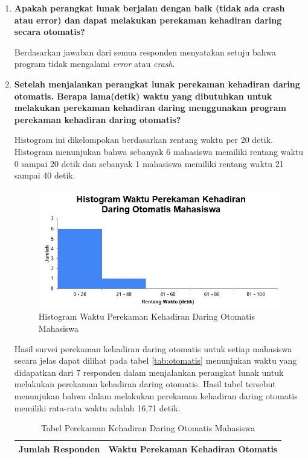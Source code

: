 \begin{enumerate}
	\item \textbf{Apakah perangkat lunak berjalan dengan baik (tidak ada crash atau error) dan dapat melakukan perekaman kehadiran daring secara otomatis?}
	
	Berdasarkan jawaban dari semua responden menyatakan setuju bahwa program tidak mengalami \textit{error} atau \textit{crash}.
	\item \textbf{Setelah menjalankan perangkat lunak perekaman kehadiran daring otomatis. Berapa lama(detik) waktu yang dibutuhkan untuk melakukan perekaman kehadiran daring menggunakan program perekaman kehadiran daring otomatis?}
	
	Histogram ini dikelompokan berdasarkan rentang waktu per 20 detik. Histogram menunjukan bahwa sebanyak 6 mahasiswa memiliki rentang waktu 0 sampai 20 detik dan sebanyak 1 mahasiswa memiliki rentang waktu 21 sampai 40 detik. 
	\begin{figure}[H]
		\centering
		\includegraphics[scale=0.75]{Gambar/HistogramDaringOtomatisMahasiswa.jpg}
		\caption{Histogram Waktu Perekaman Kehadiran Daring Otomatis Mahasiswa}
		\label{fig:olMahasiswa}
	\end{figure}
	Hasil survei perekaman kehadiran daring otomatis untuk setiap mahasiswa secara jelas dapat dilihat pada tabel \ref{tab:otomatis} menunjukan waktu yang didapatkan dari 7 responden dalam menjalankan perangkat lunak untuk melakukan perekaman kehadiran daring otomatis. Hasil tabel tersebut menunjukan bahwa dalam melakukan perekaman kehadiran daring otomatis memiliki rata-rata waktu adalah 16,71 detik.
	\begin{table}[ht]			
		\caption{Tabel Perekaman Kehadiran Daring Otomatis Mahasiswa}
		\centering
		\begin{tabular}{|p{3.5cm} |p{7cm}|}
			\hline
			Jumlah Responden &  Waktu Perekaman Kehadiran Otomatis \\ \hline     

\end{tabular}
\end{table}
\end{enumerate}
